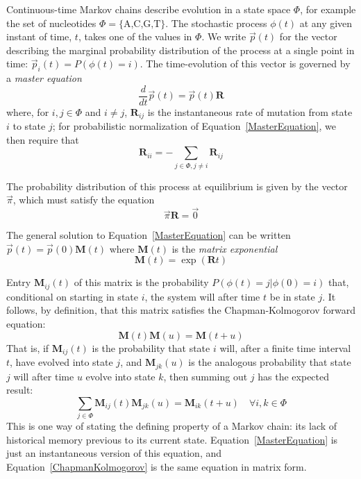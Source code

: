 \documentclass{bmcart}
\newcommand{\matr}[1]{\mathbf{#1}}
\newcommand{\eqref}[1]{Equation~\ref{#1}}
\newcommand{\statespace}{\Phi}
\newcommand{\state}{\phi}
\newcommand{\statevec}{\vec{p}}
\newcommand{\ratematrix}{\matr{R}}
\newcommand{\eqmvec}{\vec{\pi}}
\newcommand{\condmatrix}{\matr{M}}
\begin{document}
Continuous-time Markov chains describe evolution in a state space $\statespace$,
for example the set of nucleotides $\statespace = \{ \mbox{A,C,G,T} \}$.
The stochastic process $\state(t)$ at any given instant of time, $t$,
takes one of the values in $\statespace$.
We write $\statevec(t)$ for the vector describing the marginal probability distribution of the process
at a single point in time:
$\statevec_i(t) = P(\state(t) = i)$.
The time-evolution of this vector is governed by a {\em master equation}
\begin{equation}
\frac{d}{dt} \statevec(t) = \statevec(t) \ratematrix
\label{MasterEquation}
\end{equation}
where, for $i,j \in \statespace$ and $i \neq j$,
$\ratematrix_{ij}$ is the instantaneous rate of mutation from state $i$ to state $j$;
for probabilistic normalization of \eqref{MasterEquation},
we then require that
\begin{equation*}
\ratematrix_{ii} = -\sum_{j \in \statespace, j \neq i} \ratematrix_{ij}
\label{DiagonalRates}
\end{equation*}

The probability distribution of this process at equilibrium is given by the vector $\eqmvec$,
which must satisfy the equation
\[
\eqmvec \ratematrix = \vec{0}
\]

The general solution to \eqref{MasterEquation} can be
written $\statevec(t) = \statevec(0) \condmatrix(t)$
where $\condmatrix(t)$ is the {\em matrix exponential}
\begin{equation}
\condmatrix(t) = \exp ( \ratematrix t )
\label{MatrixExponential}
\end{equation}

Entry $\condmatrix_{ij}(t)$ of this matrix is the probability
$P(\state(t)=j|\state(0)=i)$
that, conditional on starting in state $i$,
the system will after time $t$ be in state $j$.
It follows, by definition, that this matrix satisfies the
Chapman-Kolmogorov forward equation:
\begin{equation}
\condmatrix(t) \condmatrix(u) = \condmatrix(t+u)
\label{ChapmanKolmogorov}
\end{equation}
That is, if $\condmatrix_{ij}(t)$ is the probability
that state $i$ will, after a finite time interval $t$, have evolved into state $j$,
and $\condmatrix_{jk}(u)$ is the analogous probability that state $j$ will after time $u$ evolve into state $k$,
then summing out $j$ has the expected result:
\[
\sum_{j \in \statespace} \condmatrix_{ij}(t) \condmatrix_{jk}(u) = \condmatrix_{ik}(t+u)
\quad \forall i,k \in \statespace
\]
This is one way of stating the defining property of a Markov chain:
its lack of historical memory previous to its current state.
\eqref{MasterEquation} is just an instantaneous version of this equation,
and \eqref{ChapmanKolmogorov} is the same equation in matrix form.
\end{document}
